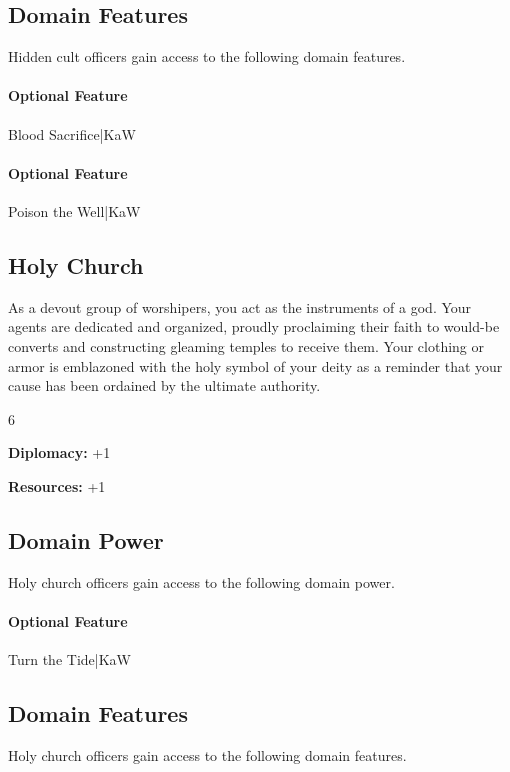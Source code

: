 \documentclass[10pt,a4paper,twoside,bg=print,twocolumn,openany,nodeprecatedcode]{dndbook}
\begin{document}
\subsection{Domain Features}
Hidden cult officers gain access to the following domain features.

\paragraph{Optional Feature}
Blood Sacrifice|KaW

\paragraph{Optional Feature}
Poison the Well|KaW

\subsection{Holy Church}
As a devout group of worshipers, you act as the instruments of a god. Your agents are dedicated and organized, proudly proclaiming their faith to would-be converts and constructing gleaming temples to receive them. Your clothing or armor is emblazoned with the holy symbol of your deity as a reminder that your cause has been ordained by the ultimate authority.

{\par \vspace { 9pt plus 3pt minus 3pt } \noindent  {} \nopagebreak }

\begin{itemize}
\begin{multicols}{6}
\item \textbf{Diplomacy:} +1
\item \textbf{Resources:} +1
\end{multicols}

\end{itemize}

\subsection{Domain Power}
Holy church officers gain access to the following domain power.

\paragraph{Optional Feature}
Turn the Tide|KaW

\subsection{Domain Features}
Holy church officers gain access to the following domain features.
\end{document}
